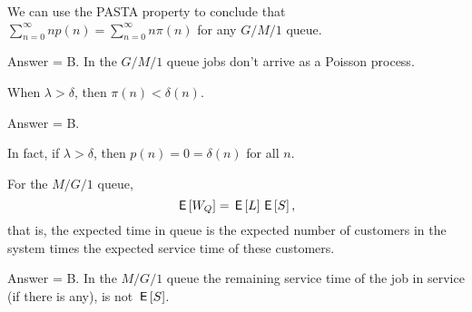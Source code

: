 \begin{exercise}[201903]
  We can use the PASTA property to conclude that $\sum_{n=0}^\infty n p(n) = \sum_{n=0}^\infty n \pi(n)$ for any $G/M/1$ queue. 
\begin{solution}
Answer = B. In the $G/M/1$ queue  jobs don't arrive as a Poisson process. 
\end{solution}
\end{exercise}

\begin{exercise}[201903]
  When $\lambda > \delta$, then $\pi(n) < \delta(n)$.

\begin{solution}
  Answer = B.

  In fact, if $\lambda>\delta$, then $p(n) = 0 = \delta(n)$ for all $n$. 
\end{solution}
\end{exercise}

\begin{exercise}[201903]
  For the $M/G/1$ queue, 
  \begin{equation*}
    \,\mathsf{E}\left[W_Q\right] = \,\mathsf{E}\left[L\right] \,\mathsf{E}\left[S\right],
  \end{equation*}
  that is, the expected time in queue is the expected number of customers in the system times the expected service time of these customers. 
\begin{solution}
Answer = B.  In the $M/G/1$ queue the remaining service time of the job in service (if there is any), is not $\,\mathsf{E}\left[S\right]$.
\end{solution}
\end{exercise}

